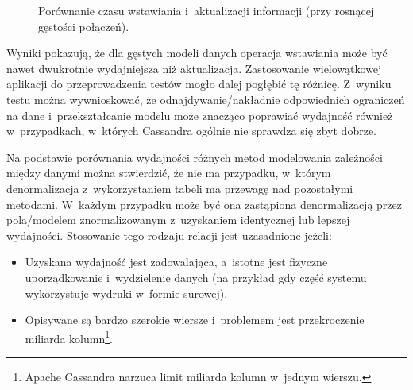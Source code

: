 \begin{figure}[ht!]
	\centering

	\caption{Porównanie czasu wstawiania i~aktualizacji informacji (przy rosnącej gęstości połączeń).}
	\label{fig:update_vs_insert_time_density_comparison}
\end{figure}

Wyniki pokazują, że dla gęstych modeli danych operacja wstawiania może być nawet dwukrotnie wydajniejsza niż aktualizacja. Zastosowanie wielowątkowej aplikacji do przeprowadzenia testów mogło dalej pogłębić tę różnicę. Z~wyniku testu można wywnioskować, że odnajdywanie/nakładnie odpowiednich ograniczeń na dane i~przekształcanie modelu może znacząco poprawiać wydajność również w~przypadkach, w~których Cassandra ogólnie nie sprawdza się zbyt dobrze.

Na podstawie porównania wydajności różnych metod modelowania zależności między danymi można stwierdzić, że nie ma przypadku, w~którym denormalizacja z~wykorzystaniem tabeli ma przewagę nad pozostałymi metodami. W~każdym przypadku może być ona zastąpiona denormalizacją przez pola/modelem znormalizowanym z~uzyskaniem identycznej lub lepszej wydajności. Stosowanie tego rodzaju relacji jest uzasadnione jeżeli:

\begin{itemize}
	\item Uzyskana wydajność jest zadowalająca, a~istotne jest fizyczne uporządkowanie i~wydzielenie danych (na przykład gdy część systemu wykorzystuje wydruki w~formie surowej).
	\item Opisywane są bardzo szerokie wiersze i~problemem jest przekroczenie miliarda kolumn\footnote{Apache Cassandra narzuca limit miliarda kolumn w~jednym wierszu.}.
\end{itemize}

